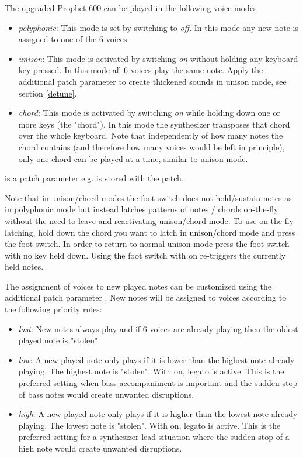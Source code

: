 The upgraded Prophet 600 can be played in the following voice modes
\begin{itemize}
  \setlength\itemsep{0cm}
  \item \textit{polyphonic}: This mode is set by switching \unison to \textit{off}. In this mode any new note is assigned to one of the 6 voices. 
  \item \textit{unison}: This mode is activated by switching \unison \textit{on} without holding any keyboard key pressed. In this mode all 6 voices play the same note. Apply the additional patch parameter \detune to create thickened sounds in unison mode, see section \ref{detune}.
  \item \textit{chord}: This mode is activated by switching \unison \textit{on} while holding down one or more keys (the "chord"). In this mode the synthesizer transposes that chord over the whole keyboard. Note that independently of how many notes the chord contains (and therefore how many voices would be left in principle), only one chord can be played at a time, similar to unison mode.
\end{itemize} 

\unison is a patch parameter e.g. is stored with the patch.

Note that in unison/chord modes the foot switch does not hold/sustain notes as in polyphonic mode but instead latches patterns of notes / chords on-the-fly without the need to leave and reactivating unison/chord mode. To use on-the-fly latching, hold down the chord you want to latch in unison/chord mode and press the foot switch. In order to return to normal unison mode press the foot switch with no key held down. Using the foot switch with \unison on re-triggers the currently held notes. 

The assignment of voices to new played notes can be customized using the additional patch parameter \prio. New notes will be assigned to voices according to the following priority rules:

\begin{itemize}
  \setlength\itemsep{0cm}
  \item \textit{last}: New notes always play and if 6 voices are already playing then the oldest played note is "stolen"
  \item \textit{low}: A new played note only plays if it is lower than the highest note already playing. The highest note is "stolen". With \unison on, legato is active. This is the preferred setting when bass accompaniment is important and the sudden stop of bass notes would create unwanted disruptions. 
  \item \textit{high}: A new played note only plays if it is higher than the lowest note already playing. The lowest note is "stolen". With \unison on, legato is active. This is the preferred setting for a synthesizer lead situation where the sudden stop of a high note would create unwanted disruptions. 
\end{itemize}

